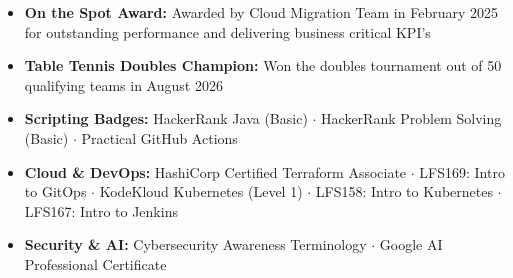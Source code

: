 \documentclass[10pt,a4paper]{article}
\begin{document}
\begin{itemize}[leftmargin=0pt, label={}, itemsep=2pt, parsep=0pt]

    \item \textbf{On the Spot Award:} Awarded by Cloud Migration Team in February 2025 for outstanding performance and delivering business critical KPI's
    
    \item \textbf{Table Tennis Doubles Champion:} Won the doubles tournament out of 50 qualifying teams in August 2026

    \item \textbf{Scripting Badges:} HackerRank Java (Basic) $\cdot$ HackerRank Problem Solving (Basic) $\cdot$ Practical GitHub Actions

    \item \textbf{Cloud \& DevOps:} HashiCorp Certified Terraform Associate $\cdot$ LFS169: Intro to GitOps $\cdot$ KodeKloud Kubernetes (Level 1) $\cdot$ LFS158: Intro to Kubernetes $\cdot$ LFS167: Intro to Jenkins

    \item \textbf{Security \& AI:} Cybersecurity Awareness Terminology $\cdot$ Google AI Professional Certificate

\end{itemize}
\end{document}
